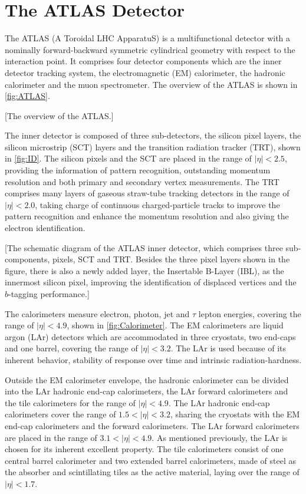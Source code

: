 \documentclass[class=NTHU_thesis, crop=false]{standalone}
\begin{document}
\chapter{The ATLAS Detector}
\label{chap:ATLAS_Detector}
The ATLAS (A Toroidal LHC ApparatuS)\cite{1748-0221-3-08-S08003} is a multifunctional detector with a nominally forward-backward symmetric cylindrical geometry with respect to the interaction point. It comprises four detector components which are the inner detector tracking system, the electromagnetic (EM) calorimeter, the hadronic calorimeter and the muon spectrometer. The overview of the ATLAS is shown in \cref{fig:ATLAS}.

[The overview of the ATLAS.]

The inner detector is composed of three sub-detectors, the silicon pixel layers, the silicon microstrip (SCT) layers and the transition radiation tracker (TRT), shown in \cref{fig:ID}. The silicon pixels and the SCT are placed in the range of $\left|\eta\right| < 2.5$, providing the information of pattern recognition, outstanding momentum resolution and both primary and secondary vertex measurements. The TRT comprises many layers of gaseous straw-tube tracking detectors in the range of $\left|\eta\right| < 2.0$, taking charge of continuous charged-particle tracks to improve the pattern recognition and enhance the momentum resolution and also giving the electron identification.

[The schematic diagram of the ATLAS inner detector, which comprises three sub-components, pixels, SCT and TRT. Besides the three pixel layers shown in the figure, there is also a newly added layer, the Insertable B-Layer (IBL)\cite{Capeans:1291633}\cite{CERN-LHCC-2012-009}, as the innermost silicon pixel, improving the identification of displaced vertices and the $b$-tagging performance.]

The calorimeters measure electron, photon, jet and $\tau$ lepton energies, covering the range of $\left|\eta\right| < 4.9$, shown in \cref{fig:Calorimeter}. The EM calorimeters are liquid argon (LAr) detectors which are accommodated in three cryostats, two end-caps and one barrel, covering the range of $\left|\eta\right| < 3.2$. The LAr is used because of its inherent behavior, stability of response over time and intrinsic radiation-hardness.

Outside the EM calorimeter envelope, the hadronic calorimeter can be divided into the LAr hadronic end-cap calorimeters, the LAr forward calorimeters and the tile calorimeters for the range of $\left|\eta\right| < 4.9$. The LAr hadronic end-cap calorimeters cover the range of $1.5 < \left|\eta\right| < 3.2$, sharing the cryostats with the EM end-cap calorimeters and the forward calorimeters. The LAr forward calorimeters are placed in the range of $3.1 < \left|\eta\right| < 4.9$. As mentioned previously, the LAr is chosen for its inherent excellent property. The tile calorimeters consist of one central barrel calorimeter and two extended barrel calorimeters, made of steel as the absorber and scintillating tiles as the active material, laying over the range of $\left|\eta\right| < 1.7$.
\end{document}
